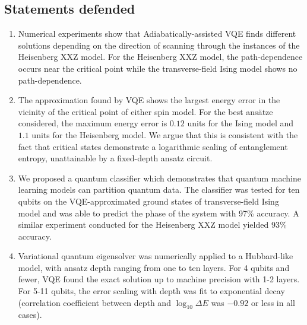 \subsection*{Statements defended}

\begin{enumerate}

    \item Numerical experiments show that Adiabatically-assisted VQE finds different solutions depending on the direction of scanning through the instances of the Heisenberg XXZ model. For the Heisenberg XXZ model, the path-dependence occurs near the critical point while the transverse-field Ising model shows no path-dependence.
    \item The approximation found by VQE shows the largest energy error in the vicinity of the critical point of either spin model. For the best ans\"atze considered, the maximum energy error is $0.12$ units for the Ising model and $1.1$ units for the Heisenberg model. We argue that this is consistent with the fact that critical states demonstrate a logarithmic scaling of entanglement entropy, 
    unattainable by a fixed-depth ansatz circuit.
    \item We proposed a quantum classifier which demonstrates that quantum machine learning models can partition quantum data. The classifier was tested for ten qubits on the VQE-approximated ground states of transverse-field Ising model and was able to predict the phase of the system with 97\% accuracy. A similar experiment conducted for the Heisenberg XXZ model yielded 93\% accuracy.

    \item Variational quantum eigensolver was numerically applied to a Hubbard-like model, with ansatz depth ranging from one to ten layers. For 4 qubits and fewer, VQE found the exact solution up to machine precision with 1-2 layers. For 5-11 qubits, the error scaling with depth was fit to exponential decay (correlation coefficient between depth and $\log_{10} \Delta E$ was $-0.92$ or less in all cases).
    

\end{enumerate}
